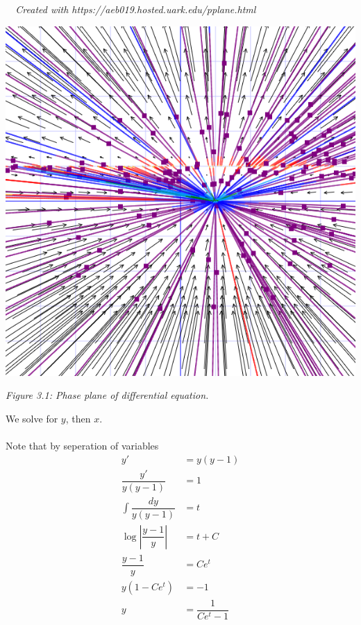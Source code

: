 \documentclass[11pt]{article}
\begin{document}
    \begin{solution}\textit{$\text{ }$ \newline Created with https://aeb019.hosted.uark.edu/pplane.html}
        \begin{center}
            \includegraphics[scale=0.3]{3.png}
        \end{center}
        \begin{center}
            \textit{Figure 3.1: Phase plane of differential equation.}
        \end{center}
    \end{solution}
    \begin{solution}
        We solve for $y$, then $x$. \\~\\
        Note that by seperation of variables 
        \begin{align}
            y' &= y(y-1) \\
            \dfrac{y'}{y(y-1)} &= 1 \\
            \int \dfrac{dy}{y(y-1)} &= t \\
            \log \left|\dfrac{y-1}{y}\right| &= t + C \\
            \dfrac{y-1}{y} &= Ce^t \\
            y(1-Ce^t) &= -1 \\
            y &= \dfrac{1}{Ce^t-1}
        \end{align}
    \end{solution}
\end{document}
